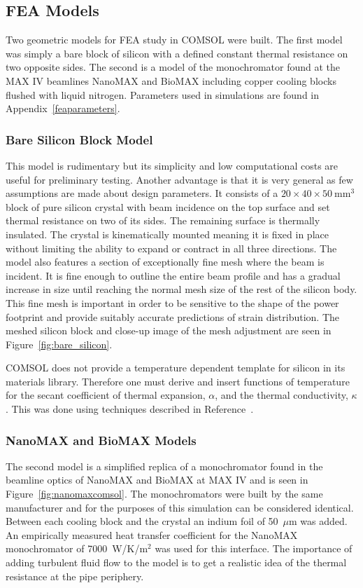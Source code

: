 \documentclass[preprint]{iucr}              %
\begin{document}
\subsection{FEA Models}

Two geometric models for FEA study in COMSOL were built. The first model was simply a bare block of silicon with a defined constant thermal resistance on two opposite sides. The second is a model of the monochromator found at the MAX IV beamlines NanoMAX and BioMAX including copper cooling blocks flushed with liquid nitrogen. Parameters used in simulations are found in Appendix~\ref{feaparameters}.

\subsubsection{Bare Silicon Block Model}
This model is rudimentary but its simplicity and low computational costs are useful for preliminary testing. Another advantage is that it is very general as few assumptions are made about design parameters. It consists of a $20\times 40\times 50~$mm$^3$ block of pure silicon crystal with beam incidence on the top surface and set thermal resistance on two of its sides. The remaining surface is thermally insulated. The crystal is kinematically mounted meaning it is fixed in place without limiting the ability to expand or contract in all three directions. The model also features a section of exceptionally fine mesh where the beam is incident. It is fine enough to outline the entire beam profile and has a gradual increase in size until reaching the normal mesh size of the rest of the silicon body. This fine mesh is important in order to be sensitive to the shape of the power footprint and provide suitably accurate predictions of strain distribution. The meshed silicon block and close-up image of the mesh adjustment are seen in Figure~\ref{fig:bare_silicon}.

COMSOL does not provide a temperature dependent template for silicon in its materials library. Therefore one must derive and insert functions of temperature for the secant coefficient of thermal expansion, $\alpha$, and the thermal conductivity, $\kappa$. This was done using techniques described in Reference~\cite{mash}.

\subsubsection{NanoMAX and BioMAX Models}\label{feamodels}
The second model is a simplified replica of a monochromator found in the beamline optics of NanoMAX and BioMAX at MAX IV and is seen in Figure~\ref{fig:nanomaxcomsol}. The monochromators were built by the same manufacturer and for the purposes of this simulation can be considered identical. Between each cooling block and the crystal an indium foil of 50~$\mu$m was added. An empirically measured heat transfer coefficient for the NanoMAX monochromator of 7000~W/K/m$^{2}$ was used for this interface. The importance of adding turbulent fluid flow to the model is to get a realistic idea of the thermal resistance at the pipe periphery.
\end{document}
